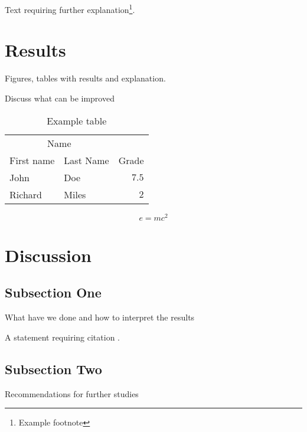 \documentclass[twoside,twocolumn]{article}
\begin{document}
	Text requiring further explanation\footnote{Example footnote}.
	
	
	\section{Results}
	
	Figures, tables with results and explanation.
	
	Discuss what can be improved
		
	\begin{table}
		\caption{Example table}
		\centering
		\begin{tabular}{llr}
			\toprule
			\multicolumn{2}{c}{Name} \\
			\cmidrule(r){1-2}
			First name & Last Name & Grade \\
			\midrule
			John & Doe & $7.5$ \\
			Richard & Miles & $2$ \\
			\bottomrule
		\end{tabular}
	\end{table}
	
	\blindtext %
	
	\begin{equation}
		\label{eq:emc}
		e = mc^2
	\end{equation}
	
	\blindtext %
	
	
	\section{Discussion}
	
	\subsection{Subsection One}
	
	What have we done and how to interpret the results
	
	A statement requiring citation \cite{Figueredo:2009dg}.
	\blindtext %
	
	\subsection{Subsection Two}
	
	Recommendations for further studies
	
\end{document}
